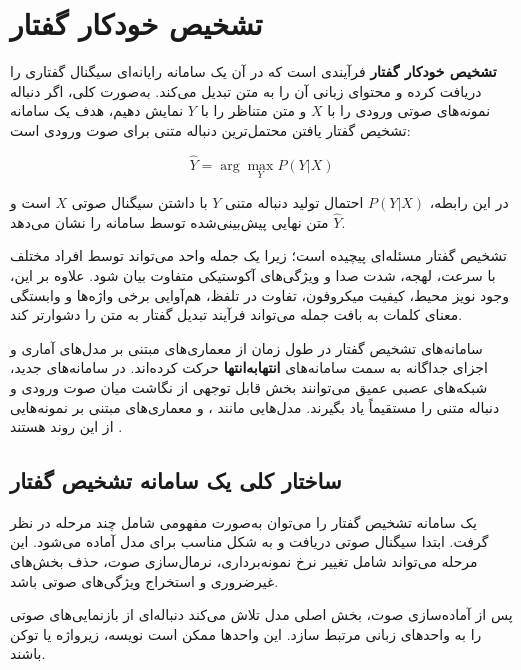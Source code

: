 \section{تشخیص خودکار گفتار}

\textbf{تشخیص خودکار گفتار}
فرآیندی است که در آن یک سامانه رایانه‌ای سیگنال گفتاری را دریافت
کرده و محتوای زبانی آن را به متن تبدیل می‌کند.
به‌صورت کلی، اگر دنباله نمونه‌های صوتی ورودی را با $X$ و متن
متناظر را با $Y$ نمایش دهیم، هدف یک سامانه تشخیص گفتار یافتن
محتمل‌ترین دنباله متنی برای صوت ورودی است:

\begin{equation}
\hat{Y}
=
\arg\max_Y P(Y|X)
\end{equation}

در این رابطه، $P(Y|X)$ احتمال تولید دنباله متنی $Y$ با داشتن
سیگنال صوتی $X$ است و $\hat{Y}$ متن نهایی پیش‌بینی‌شده توسط
سامانه را نشان می‌دهد.

تشخیص گفتار مسئله‌ای پیچیده است؛ زیرا یک جمله واحد می‌تواند
توسط افراد مختلف با سرعت، لهجه، شدت صدا و ویژگی‌های آکوستیکی
متفاوت بیان شود.
علاوه بر این، وجود نویز محیط، کیفیت میکروفون، تفاوت در تلفظ،
هم‌آوایی برخی واژه‌ها و وابستگی معنای کلمات به بافت جمله می‌تواند
فرآیند تبدیل گفتار به متن را دشوارتر کند.

سامانه‌های تشخیص گفتار در طول زمان از معماری‌های مبتنی بر
مدل‌های آماری و اجزای جداگانه به سمت سامانه‌های
\textbf{انتهابه‌انتها}
حرکت کرده‌اند.
در سامانه‌های جدید، شبکه‌های عصبی عمیق می‌توانند بخش قابل توجهی
از نگاشت میان صوت ورودی و دنباله متنی را مستقیماً یاد بگیرند.
مدل‌هایی مانند ،  و
معماری‌های مبتنی بر  نمونه‌هایی از این روند هستند
\cite{baevski2020wav2vec2,radford2022whisper,gulati2020conformer}.


\subsection{ساختار کلی یک سامانه تشخیص گفتار}

یک سامانه تشخیص گفتار را می‌توان به‌صورت مفهومی شامل چند مرحله
در نظر گرفت.
ابتدا سیگنال صوتی دریافت و به شکل مناسب برای مدل آماده می‌شود.
این مرحله می‌تواند شامل تغییر نرخ نمونه‌برداری، نرمال‌سازی صوت،
حذف بخش‌های غیرضروری و استخراج ویژگی‌های صوتی باشد.

پس از آماده‌سازی صوت، بخش اصلی مدل تلاش می‌کند دنباله‌ای از
بازنمایی‌های صوتی را به واحدهای زبانی مرتبط سازد.
این واحدها ممکن است نویسه، زیرواژه
یا توکن باشند.

